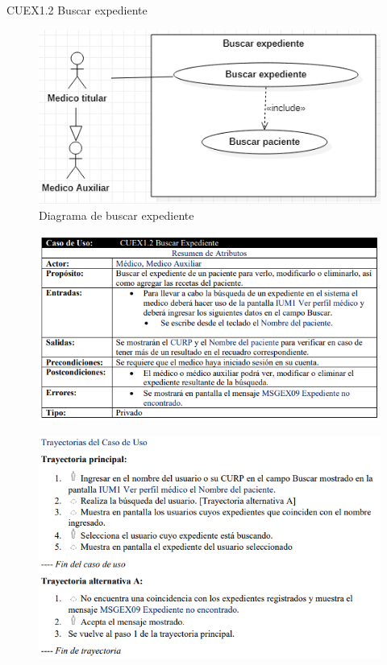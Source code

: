 \documentclass[12pt,letterpaper]{article}
\begin{document}
            \newpage
            CUEX1.2 Buscar expediente
            \begin{figure}[H]
                \centering
                \includegraphics [scale=0.7]{casosUso/buscarExpediente}
                \caption{Diagrama de buscar expediente}
            \end{figure}
            \begin{figure}[H]
                \centering
                \includegraphics [scale=0.8]{specs/specBuscarExpediente}
            \end{figure}
            \begin{figure}[H]
                \centering
                \includegraphics [scale=0.9]{specs/trayBuscarExpediente}
            \end{figure}
\end{document}
